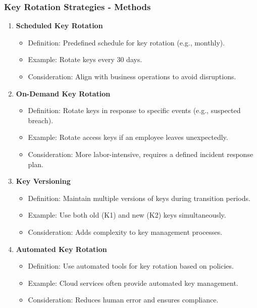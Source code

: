 \documentclass{beamer}
\begin{document}
\begin{frame}[fragile]
    \frametitle{Key Rotation Strategies - Methods}
    \begin{enumerate}
        \item \textbf{Scheduled Key Rotation}
            \begin{itemize}
                \item Definition: Predefined schedule for key rotation (e.g., monthly).
                \item Example: Rotate keys every 30 days.
                \item Consideration: Align with business operations to avoid disruptions.
            \end{itemize}
        
        \item \textbf{On-Demand Key Rotation}
            \begin{itemize}
                \item Definition: Rotate keys in response to specific events (e.g., suspected breach).
                \item Example: Rotate access keys if an employee leaves unexpectedly.
                \item Consideration: More labor-intensive, requires a defined incident response plan.
            \end{itemize}
        
        \item \textbf{Key Versioning}
            \begin{itemize}
                \item Definition: Maintain multiple versions of keys during transition periods.
                \item Example: Use both old (K1) and new (K2) keys simultaneously.
                \item Consideration: Adds complexity to key management processes.
            \end{itemize}
        
        \item \textbf{Automated Key Rotation}
            \begin{itemize}
                \item Definition: Use automated tools for key rotation based on policies.
                \item Example: Cloud services often provide automated key management.
                \item Consideration: Reduces human error and ensures compliance.
            \end{itemize}
    \end{enumerate}
\end{frame}
\end{document}
